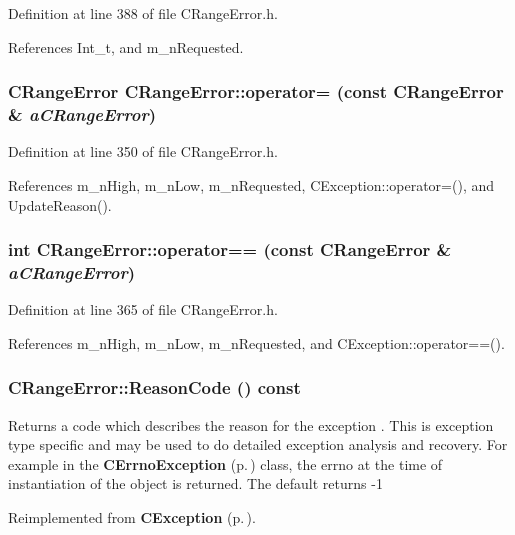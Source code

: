 Definition at line 388 of file CRange\-Error.h.

References Int\_\-t, and m\_\-n\-Requested.
\subsubsection{\setlength{\rightskip}{0pt plus 5cm}CRange\-Error CRange\-Error::operator= (const CRange\-Error \& {\em a\-CRange\-Error})\hspace{0.3cm}{\tt  [inline]}}\label{classCRangeError_a4}




Definition at line 350 of file CRange\-Error.h.

References m\_\-n\-High, m\_\-n\-Low, m\_\-n\-Requested, CException::operator=(), and Update\-Reason().
\subsubsection{\setlength{\rightskip}{0pt plus 5cm}int CRange\-Error::operator== (const CRange\-Error \& {\em a\-CRange\-Error})\hspace{0.3cm}{\tt  [inline]}}\label{classCRangeError_a5}




Definition at line 365 of file CRange\-Error.h.

References m\_\-n\-High, m\_\-n\-Low, m\_\-n\-Requested, and CException::operator==().
\subsubsection{ CRange\-Error::Reason\-Code () const\hspace{0.3cm}{\tt  [virtual]}}\label{classCRangeError_a10}


Returns a code which describes the reason for the exception . This is exception type specific and may be used to do detailed exception analysis and recovery. For example in the {\bf CErrno\-Exception} {\rm (p.\,\pageref{classCErrnoException})} class, the errno at the time of instantiation of the object is returned. The default returns -1 

Reimplemented from {\bf CException} {\rm (p.\,\pageref{classCException_a9})}.

